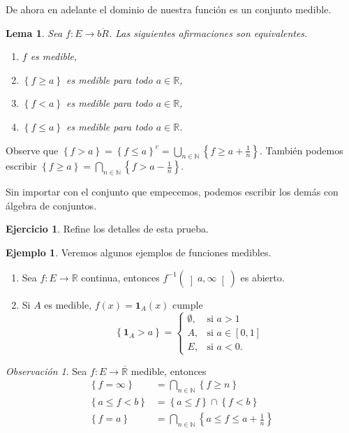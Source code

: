 \documentclass[12pt]{article}
\theoremstyle{plain}
\newtheorem{Lem}[Th]{Lema}             %
\theoremstyle{definition}
\newtheorem{Ex}[Th]{Ejemplo}               %
\newtheorem{Ej}[Th]{Ejercicio}
\theoremstyle{remark}
\newtheorem{Rmk}[Th]{Observación}      %
\numberwithin{equation}{section}
\newcommand{\bN}{\mathbb{N}}        %
\newcommand{\bR}{\mathbb{R}}        %
\renewcommand{\geq}{\geqslant}      %
\renewcommand{\leq}{\leqslant}      %
\renewcommand{\:}{\colon}           %
\newcommand{\conj}[1]{\left\lbrace#1\right\rbrace}
\newcommand{\bonj}[1]{\left\lbrack#1\right\rbrack}
\newcommand{\obonj}[1]{\left\rbrack#1\right\lbrack}
\begin{document}
\begin{multicols}{2}
De ahora en adelante el dominio de nuestra función es un conjunto medible.

\begin{Lem}
  Sea $f\: E\to\overline{bR}$. Las siguientes afirmaciones son equivalentes.
  \begin{enumerate}
    \item $f$ es medible,
    \item $\conj{f\geq a}$ es medible para todo $a\in\bR$,
    \item $\conj{f< a}$ es medible para todo $a\in\bR$,
    \item $\conj{f\leq a}$ es medible para todo $a\in\bR$.
  \end{enumerate}
\end{Lem}

\begin{ptcbp}
Observe que $\conj{f>a}=\conj{ f\leq a}^c=\bigcup_{n\in\bN}\conj{f\geq a+\frac{1}{n}}$. También podemos escribir $\conj{f\geq a}=\bigcap_{n\in\bN}\conj{f>a-\frac{1}{n}}$.\par
Sin importar con el conjunto que empecemos, podemos escribir los demás con álgebra de conjuntos.
\end{ptcbp}

\begin{Ej}
  Refine los detalles de esta prueba.
\end{Ej}

\begin{Ex}
  Veremos algunos ejemplos de funciones medibles.
  \begin{enumerate}
    \item Sea $f\: E\to\bR$ continua, entonces $f^{-1}(\obonj{a,\infty})$ es abierto.
    \item Si $A$ es medible,  $f(x)=\mathbf{1}_A(x)$ cumple
    $$
    \conj{\mathbf{1}_A>a}
    =\begin{cases}
       \emptyset, & \mbox{si } a>1 \\
       A, & \mbox{si } a\in\bonj{0,1} \\
       E, & \mbox{si } a<0.
     \end{cases}
    $$
  \end{enumerate}
\end{Ex}

\begin{Rmk}
  Sea $f\: E\to\overline{\bR}$ medible, entonces
  \begin{align*}
    \conj{f=\infty} &=\bigcap_{n\in\bN}\conj{f\geq n}\\
    \conj{a\leq f<b} &=\conj{a\leq f}\cap\conj{f<b}\\
    \conj{f=a} &=\bigcap_{n\in\bN}\conj{a\leq f\leq a+\frac{1}{n}}
  \end{align*}
\end{Rmk}


\end{multicols}
\end{document}
